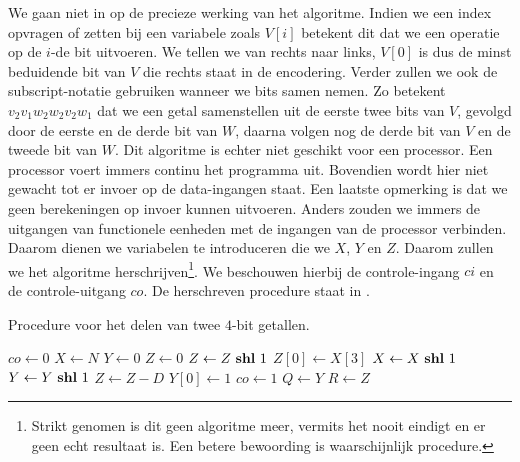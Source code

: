 We gaan niet in op de precieze werking van het algoritme. Indien we een index opvragen of zetten bij een variabele zoals $V\left[i\right]$ betekent dit dat we een operatie op de $i$-de bit uitvoeren. We tellen we van rechts naar links, $V[0]$ is dus de minst beduidende bit van $V$ die rechts staat in de encodering. Verder zullen we ook de subscript-notatie gebruiken wanneer we bits samen nemen. Zo betekent $v_2v_1w_2w_2v_2w_1$ dat we een getal samenstellen uit de eerste twee bits van $V$, gevolgd door de eerste en de derde bit van $W$, daarna volgen nog de derde bit van $V$ en de tweede bit van $W$. Dit algoritme is echter niet geschikt voor een processor. Een processor voert immers continu het programma uit. Bovendien wordt hier niet gewacht tot er invoer op de data-ingangen staat. Een laatste opmerking is dat we geen berekeningen op invoer kunnen uitvoeren. Anders zouden we immers de uitgangen van functionele eenheden met de ingangen van de processor verbinden. Daarom dienen we variabelen te introduceren die we $X$, $Y$ en $Z$. Daarom zullen we het algoritme herschrijven\footnote{Strikt genomen is dit geen algoritme meer, vermits het nooit eindigt en er geen echt resultaat is. Een betere bewoording is waarschijnlijk procedure.}. We beschouwen hierbij de controle-ingang $ci$ en de controle-uitgang $co$. De herschreven procedure staat in .
\begin{algorithm}[hbt]
\caption{Procedure voor het delen van twee $4$-bit getallen.}\label{alg:devisionFSMDRev}
\begin{algorithmic}[1]
\Repeat\label{algl:s1start}
\State $co\gets 0$
\State $X\gets N$
\State $Y\gets 0$
\State $Z\gets 0$
\label{algl:s1stop}
\label{algl:s2start}
\State $Z\gets Z\mbox{ \textbf{shl} }{}1$
\State $Z\left[0\right]\gets X\left[3\right]$
\State $X\gets X\mbox{ \textbf{shl} }{}1$
\State $Y\gets Y\mbox{ \textbf{shl} }{}1$
\label{algl:devisionFSMDComp}
\State $Z\gets Z-D$\label{algl:devisionFSMDSub}
\State $Y\left[0\right]\gets 1$
\EndIf
\EndFor\label{algl:s2stop}
\Repeat\label{algl:s3start}
\State $co\gets 1$
\State $Q\gets Y$
\State $R\gets Z$
\label{algl:s3stop}
\EndWhile
\EndProcedure
\end{algorithmic}
\end{algorithm}
